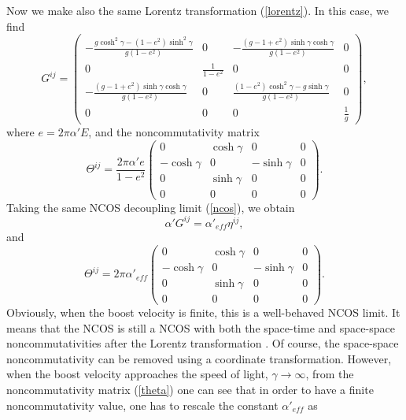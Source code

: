 \documentclass[a4paper,12pt]{article}
\begin{document}
Now we make also the same Lorentz transformation (\ref{lorentz}). In this case,
we find
\begin{equation}
G^{ij} = \left (
\begin{array}{cccc}
-\frac{g\cosh^2\gamma -(1-e^2)\sinh^2\gamma}{g(1-e^2)} & 0&
-\frac{(g-1+e^2)\sinh\gamma\cosh\gamma}{g(1-e^2)} &0 \\
0 &\frac{1}{1-e^2} &0 &0 \\
-\frac{(g-1+e^2)\sinh\gamma \cosh\gamma}{g(1-e^2)} &0& \frac{(1-e^2)
\cosh^2\gamma-g\sinh\gamma}{g(1-e^2)}&0 \\
0 & 0& 0& \frac{1}{g}
\end{array} \right ),
\end{equation}
where $e=2\pi \alpha' E$, and the noncommutativity matrix
\begin{equation}
\Theta^{ij}=\frac{2\pi \alpha'e}{1-e^2} \left (
\begin{array}{cccc}
0 & \cosh\gamma &0& 0\\
-\cosh\gamma &0 &-\sinh\gamma &0 \\
0& \sinh\gamma &0 &0 \\
0 & 0& 0& 0
\end{array} \right ).
\end{equation}
Taking the same NCOS decoupling limit (\ref{ncos}), we obtain
\begin{equation}
\label{metric}
\alpha' G^{ij} =\alpha'_{eff}\eta ^{ij},
\end{equation}
and
\begin{equation}
\label{theta}
\Theta^{ij}= 2\pi \alpha'_{eff} \left (
\begin{array}{cccc}
0 & \cosh\gamma &0& 0\\
-\cosh\gamma &0 &-\sinh\gamma &0 \\
0& \sinh\gamma &0 &0 \\
0 & 0& 0& 0
\end{array} \right ).
\end{equation}
Obviously, when the boost velocity is finite, this is a well-behaved NCOS
limit. It means that the NCOS is still a NCOS with both the space-time and
space-space noncommutativities after the Lorentz
transformation \cite{Chen}. Of course,
the space-space noncommutativity can be removed using a coordinate
transformation. However, when the boost velocity
approaches the speed of light, $\gamma \to \infty$, from the
noncommutativity matrix (\ref{theta}) one can see that in order to have a
finite noncommutativity value, one has to rescale the constant $\alpha'_{eff}$
 as
\end{document}
